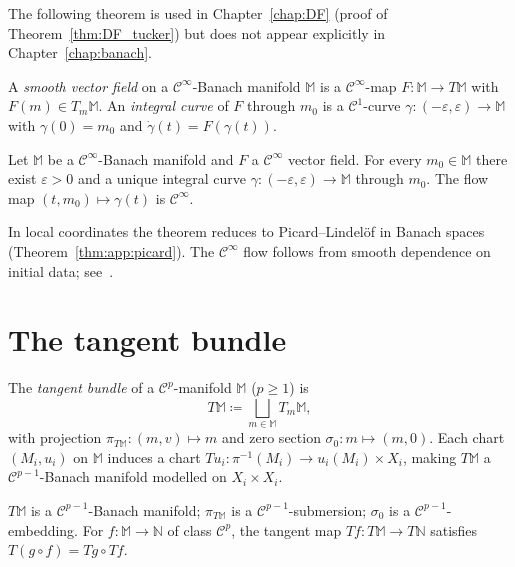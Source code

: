 The following theorem is used in Chapter~\ref{chap:DF}
(proof of Theorem~\ref{thm:DF_tucker}) but does not appear
explicitly in Chapter~\ref{chap:banach}.

A \emph{smooth vector field} on a $\mathcal{C}^\infty$-Banach manifold
$\mathbb{M}$ is a $\mathcal{C}^\infty$-map
$F: \mathbb{M} \to T\mathbb{M}$ with $F(m) \in T_m\mathbb{M}$.
An \emph{integral curve} of $F$ through $m_0$ is a $\mathcal{C}^1$-curve
$\gamma: (-\varepsilon,\varepsilon) \to \mathbb{M}$ with
$\gamma(0)=m_0$ and $\dot\gamma(t)=F(\gamma(t))$.

\begin{theorem}
\label{thm:app:ode}
Let $\mathbb{M}$ be a $\mathcal{C}^\infty$-Banach manifold and $F$ a
$\mathcal{C}^\infty$ vector field. For every $m_0\in\mathbb{M}$ there
exist $\varepsilon>0$ and a unique integral curve
$\gamma:(-\varepsilon,\varepsilon)\to\mathbb{M}$ through $m_0$.
The flow map $(t,m_0)\mapsto\gamma(t)$ is $\mathcal{C}^\infty$.
\end{theorem}

\begin{remark}
In local coordinates the theorem reduces to Picard--Lindelöf in Banach
spaces (Theorem~\ref{thm:app:picard}). The $\mathcal{C}^\infty$ flow
follows from smooth dependence on initial data; see~\cite[Ch.~4]{Lang1999}.
\end{remark}

\section{The tangent bundle}
\label{app:manifolds:tangentbundle}

The \emph{tangent bundle} of a $\mathcal{C}^p$-manifold $\mathbb{M}$
($p\geq 1$) is
\begin{equation}
\label{eq:app:tangent_bundle}
    T\mathbb{M} \coloneqq \bigsqcup_{m\in\mathbb{M}} T_m\mathbb{M},
\end{equation}
with projection $\pi_{T\mathbb{M}}:(m,v)\mapsto m$ and zero section
$\sigma_0:m\mapsto(m,0)$. Each chart $(M_i,u_i)$ on $\mathbb{M}$
induces a chart $Tu_i:\pi^{-1}(M_i)\to u_i(M_i)\times X_i$,
making $T\mathbb{M}$ a $\mathcal{C}^{p-1}$-Banach manifold modelled
on $X_i\times X_i$.

\begin{proposition}
\label{prop:app:tangent_bundle}
$T\mathbb{M}$ is a $\mathcal{C}^{p-1}$-Banach manifold; $\pi_{T\mathbb{M}}$
is a $\mathcal{C}^{p-1}$-submersion; $\sigma_0$ is a
$\mathcal{C}^{p-1}$-embedding. For $f:\mathbb{M}\to\mathbb{N}$
of class $\mathcal{C}^p$, the tangent map $Tf:T\mathbb{M}\to T\mathbb{N}$
satisfies $T(g\circ f)=Tg\circ Tf$.
\end{proposition}

